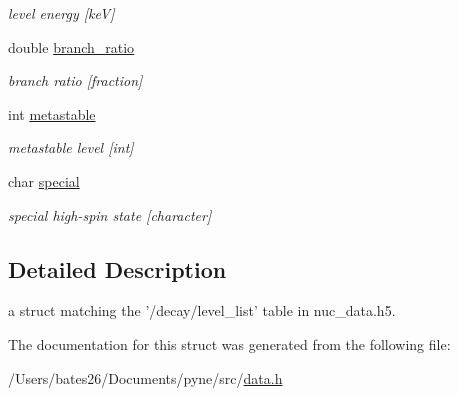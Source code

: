 \begin{DoxyCompactItemize}
\begin{DoxyCompactList}\small\item\em level energy \mbox{[}ke\+V\mbox{]} \end{DoxyCompactList}\item 
\hypertarget{structpyne_1_1level__data_a5ce97c540e0ce558156e5a43510a4633}{double \hyperlink{structpyne_1_1level__data_a5ce97c540e0ce558156e5a43510a4633}{branch\+\_\+ratio}}\label{structpyne_1_1level__data_a5ce97c540e0ce558156e5a43510a4633}

\begin{DoxyCompactList}\small\item\em branch ratio \mbox{[}fraction\mbox{]} \end{DoxyCompactList}\item 
\hypertarget{structpyne_1_1level__data_a7a71068eed39597f007cc6624727e954}{int \hyperlink{structpyne_1_1level__data_a7a71068eed39597f007cc6624727e954}{metastable}}\label{structpyne_1_1level__data_a7a71068eed39597f007cc6624727e954}

\begin{DoxyCompactList}\small\item\em metastable level \mbox{[}int\mbox{]} \end{DoxyCompactList}\item 
\hypertarget{structpyne_1_1level__data_acabc31aa71741dbc2ea5485ca51da0d6}{char \hyperlink{structpyne_1_1level__data_acabc31aa71741dbc2ea5485ca51da0d6}{special}}\label{structpyne_1_1level__data_acabc31aa71741dbc2ea5485ca51da0d6}

\begin{DoxyCompactList}\small\item\em special high-\/spin state \mbox{[}character\mbox{]} \end{DoxyCompactList}\end{DoxyCompactItemize}


\subsection{Detailed Description}
a struct matching the '/decay/level\+\_\+list' table in nuc\+\_\+data.\+h5. 

The documentation for this struct was generated from the following file\+:\begin{DoxyCompactItemize}
\item 
/\+Users/bates26/\+Documents/pyne/src/\hyperlink{data_8h}{data.\+h}\end{DoxyCompactItemize}
